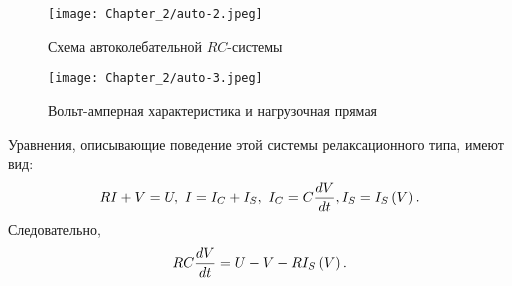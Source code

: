 \begin{figure}
	\centering
	\texttt{[image: Chapter\_2/auto-2.jpeg]}
	\caption{Схема автоколебательной $RC$-системы}
\end{figure}

\begin{figure}
	\centering
	\texttt{[image: Chapter\_2/auto-3.jpeg]}
	\caption{Вольт-амперная характеристика и нагрузочная прямая}
\end{figure}


Уравнения, описывающие поведение этой системы релаксационного типа,
имеют вид:
\begin{equation}
	\eqmark{auto-4}
	RI+V=U,~ I=I_C+I_S,~ I_C=C\frac{dV}{dt}, I_S=I_S\left( V \right).
\end{equation}
Следовательно,
\begin{equation}
	\eqmark{auto-5}
	RC\frac{dV}{dt}=U-V-R{{I}_{S}}\left( V \right).
\end{equation}

